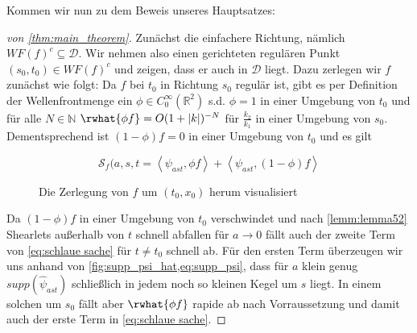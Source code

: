 

Kommen wir nun zu dem Beweis unseres Hauptsatzes:

\begin{proof}[von \ref{thm:main_theorem}]
\label{proof:main_theorem}
Zunächst die einfachere Richtung, nämlich $WF(f)^c \subseteq \mathcal{D}$.
Wir nehmen also einen gerichteten regulären Punkt $(s_0,t_0) \in WF(f)^c$ und zeigen, dass er auch in $\mathcal{D}$ liegt. Dazu zerlegen wir $f$ zunächst wie folgt:
 Da $f$ bei $t_0$ in Richtung $s_0$ regulär ist, gibt es per Definition der Wellenfrontmenge ein $\phi \in C_0^\infty(\mathbb{R}^2)$ s.d. $\phi = 1$ in einer Umgebung von $t_0$ und für alle $N \in \mathbb{N}$ $\rwhat{\phi f} = O(1+|k|)^{-N}$ für $\frac{k_2}{k_1}$ in einer Umgebung von $s_0$. Dementsprechend ist $(1-\phi)f = 0$ in einer Umgebung von $t_0$ und es gilt

 \begin{equation}
     \mathcal{S}_f (a,s,t = \left\langle \psi_{ast},\phi f \right\rangle
                                + \left\langle \psi_{ast},(1-\phi) f \right\rangle
 \label{eq:schlaue sache}
 \end{equation}

\begin{figure}[ht]
\centering

\caption{Die Zerlegung von $f$ um $(t_0,x_0)$ herum visualisiert}
\label{fig:smart_decomposition}
\end{figure}

Da $(1-\phi)f$ in einer Umgebung von $t_0$ verschwindet und nach \cref{lemm:lemma52} Shearlets außerhalb von $t$ schnell abfallen für $a \to 0$ fällt auch der zweite Term von \cref{eq:schlaue sache}
für $t \neq t_0$ schnell ab. Für den ersten Term überzeugen wir uns anhand von \cref{fig:supp_psi_hat,eq:supp_psi}, dass für $a$ klein genug $supp(\hat\psi_{ast})$ schließlich in jedem noch so kleinen Kegel um $s$ liegt. In einem solchen um $s_0$ fällt aber $\rwhat{\phi f}$ rapide ab nach Vorraussetzung und damit auch der erste Term in \eqref{eq:schlaue sache}.


\end{proof}
